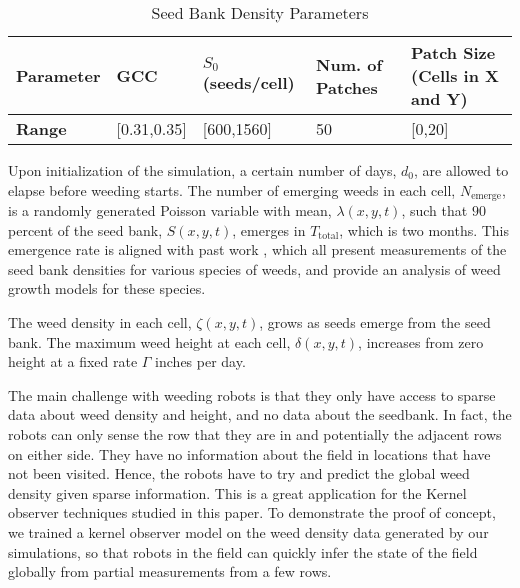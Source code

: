 \begin{table}[h]
	\centering
	\caption{Seed Bank Density Parameters} \label{tab:weedparams} 
	\begin{center}
		\begin{tabular}{ | l | l | l | l | l |}
			\hline
			\textbf{Parameter} & GCC         & $S_0$ (seeds/cell)       & Num. of Patches & Patch Size (Cells in X and Y)  \\ \hline
			\textbf{Range}     & [0.31,0.35] & [600,1560] & 50  & [0,20]  \\ \hline
		\end{tabular}
	\end{center}
\end{table}


Upon initialization of the simulation, a certain number of days, $d_0$, are allowed to elapse before weeding starts. The number of emerging weeds in each cell, $N_{{\text{emerge}}}$, is a randomly generated Poisson variable with mean, $\lambda \left( {x,y,t} \right) $, such that $90$ percent of the seed bank, $S\left( {x,y,t} \right)$, emerges in $T_\text{total}$, which is two months. This emergence rate is aligned with past work \cite{Nordby2018,schutte2014common, werle2014predicting, sellers2003comparative, horak2000growth},  which all present measurements of the seed bank densities for various species of weeds, and provide an analysis of weed growth models for these species.

The weed density in each cell, $\zeta \left( {x,y,t} \right) $, grows as seeds emerge from the seed bank. The maximum weed height at each cell, $\delta \left( {x,y,t} \right)$, increases from zero height at a fixed rate $\Gamma$ inches per day.

The main challenge with weeding robots is that they only have access to sparse data about weed density and height, and no data about the seedbank. In fact, the robots can only sense the row that they are in and potentially the adjacent rows on either side. They have no information about the field in locations that have not been visited. Hence, the robots have to try and predict the global weed density given sparse information. This is a great application for the Kernel observer techniques studied in this paper. To demonstrate the proof of concept, we trained a kernel observer model on the weed density data generated by our simulations, so that robots in the field can quickly infer the state of the field globally from partial measurements from a few rows.

